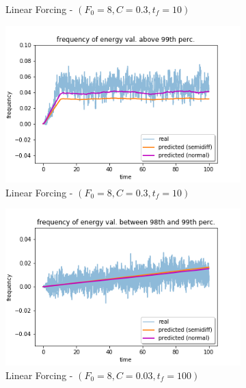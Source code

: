 \documentclass{article}
\begin{document}
\begin{figure}[!h]
\begin{subfigure}[b]{0.48\textwidth}
		\caption{Linear Forcing - $(F_0=8, C=0.3, t_f=10)$}
		\label{fig:pred_energy_bin_0.98q_0.99q_L_03_10}
	\end{subfigure}%
	\begin{subfigure}[b]{0.48\textwidth}
		\includegraphics[width=1\linewidth]{fig/pred_energy_exceed_099q_L_03_10.png}
		\caption{Linear Forcing - $(F_0=8, C=0.3, t_f=10)$}
		\label{fig:pred_energy_exceed_0.99q_L_03_10}
	\end{subfigure}
	\begin{subfigure}[b]{0.48\textwidth}
		\includegraphics[width=1\linewidth]{fig/pred_energy_bin_098q_099q_L_003_100.png}
		\caption{Linear Forcing - $(F_0=8, C=0.03, t_f=100)$}
		\label{fig:pred_energy_bin_0.98q_0.99q_L_003_100}
	\end{subfigure}%
	\begin{subfigure}[b]{0.48\textwidth}

\end{subfigure}
\end{figure}
\end{document}
